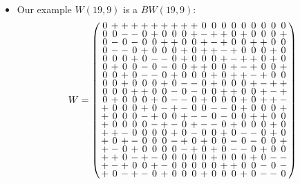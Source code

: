 \documentclass{beamer}
\begin{document}
\begin{frame}

  \begin{itemize}
  \item Our example $W(19,9)$ is a $BW(19,9)$:
    \[
      W=
      \arraycolsep=1.25pt\def\arraystretch{0.625}
      \left(
        \begin{array}{ccccccccccccccccccc}
          0&+&+&+&+&+&+&+&+&+&0&0&0&0&0&0&0&0&0\\
          0&0&-&-&0&+&0&0&0&+&-&+&+&0&+&0&0&0&+\\
          0&-&0&-&0&0&+&+&0&0&+&-&+&0&0&+&+&0&0\\
          0&-&-&0&+&0&0&0&+&0&+&+&-&+&0&0&0&+&0\\
          0&0&0&+&0&-&-&0&+&0&0&0&+&-&+&+&0&+&0\\
          0&+&0&0&-&0&-&0&0&+&+&0&0&+&-&+&0&0&+\\
          0&0&+&0&-&-&0&+&0&0&0&+&0&+&+&-&+&0&0\\
          0&0&+&0&0&0&+&0&-&-&0&+&0&0&0&+&-&+&+\\
          0&0&0&+&+&0&0&-&0&-&0&0&+&+&0&0&+&-&+\\
          0&+&0&0&0&+&0&-&-&0&+&0&0&0&+&0&+&+&-\\
          +&0&0&0&+&0&-&+&-&0&0&-&-&0&+&0&0&0&+\\
          +&0&0&0&-&+&0&0&+&-&-&0&-&0&0&+&+&0&0\\
          +&0&0&0&0&-&+&-&0&+&-&-&0&+&0&0&0&+&0\\
          +&+&-&0&0&0&0&+&0&-&0&0&+&0&-&-&0&+&0\\
          +&0&+&-&0&0&0&-&+&0&+&0&0&-&0&-&0&0&+\\
          +&-&0&+&0&0&0&0&-&+&0&+&0&-&-&0&+&0&0\\
          +&+&0&-&+&-&0&0&0&0&0&+&0&0&0&+&0&-&-\\
          +&-&+&0&0&+&-&0&0&0&0&0&+&+&0&0&-&0&-\\
          +&0&-&+&-&0&+&0&0&0&+&0&0&0&+&0&-&-&0\\
        \end{array}
      \right)
    \]
  \end{itemize}

\end{frame}
\end{document}
